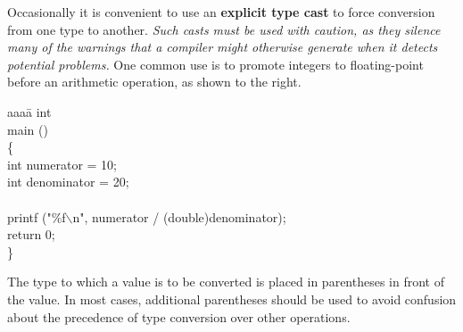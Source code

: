 \begin{minipage}{2.3in}
Occasionally it is convenient to use an {\bf explicit type cast} to force
conversion from one type to another.  {\em Such casts must be used
with caution, as they silence many of the warnings that a compiler
might otherwise generate when it detects potential problems.}  One
common use is to promote integers to floating-point before an
arithmetic operation, as shown to the right.\linebreak
\end{minipage}\hspace{.2in}%
\begin{minipage}{4in}
{\fix
\begin{tabbing}
aaaa\=\kill
int\\
main ()\\
\{\\
\>  int numerator = 10;\\
\>  int denominator = 20;\\
\>\\
\>  printf ("\%f$\backslash$n", numerator / (double)denominator);\\
\>  return 0;\\
\}
\end{tabbing}
}
\end{minipage}\vspace{-14pt}

The type to which a value is to be converted
is placed in parentheses in front of the value.  In most cases,
additional parentheses should be used to avoid confusion about the
precedence of type conversion over other operations.\\

\vfill

\pagebreak

